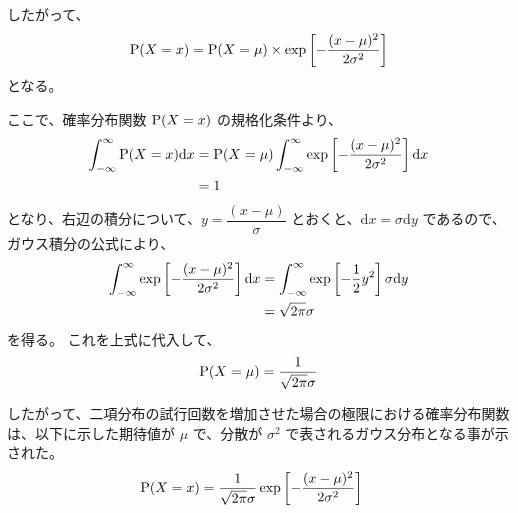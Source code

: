 \documentclass[uplatex,dvipdfmx,a4paper,11pt, titlepage]{jsarticle}
\newcommand{\diff}{\mathrm d}
\begin{document}
\begin{appendix}
したがって、
\begin{equation}
{\rm P}(X=x) = {\rm P}(X=\mu) \times \exp \left[-\dfrac{(x-\mu)^2}{2 \sigma^2} \right]
\end{equation}
となる。

ここで、確率分布関数 ${\rm P}(X=x)$ の規格化条件より、
\begin{align}
\int_{-\infty}^{\infty} {\rm P}(X=x) \diff x 
	&= {\rm P}(X=\mu) \int_{-\infty}^{\infty} \exp \left[-\dfrac{(x-\mu)^2}{2 \sigma^2} \right] \diff x \notag \\
	&= 1
\end{align}
となり、右辺の積分について、$y=\dfrac{(x-\mu)}{\sigma}$ とおくと、$\diff x = \sigma \diff y$ であるので、ガウス積分の公式により、
\begin{align}
\int_{-\infty}^{\infty} \exp \left[-\dfrac{(x-\mu)^2}{2 \sigma^2} \right] \diff x 
	&= \int_{-\infty}^{\infty} \exp \left[- \dfrac{1}{2} y^2 \right] \sigma \diff y \notag \\
	&= \sqrt{2 \pi} \sigma
\end{align}
を得る。
これを上式に代入して、
\begin{align}
{\rm P}(X=\mu) = \dfrac{1}{\sqrt{2 \pi} \sigma}
\end{align}

したがって、二項分布の試行回数を増加させた場合の極限における確率分布関数は、以下に示した期待値が $\mu$ で、分散が $\sigma^2$ で表されるガウス分布となる事が示された。
\begin{align}
{\rm P}(X=x) 
	&= \dfrac{1}{\sqrt{2 \pi} \sigma} \exp \left[-\dfrac{(x-\mu)^2}{2 \sigma^2} \right]
\end{align}


\end{appendix}
\end{document}
